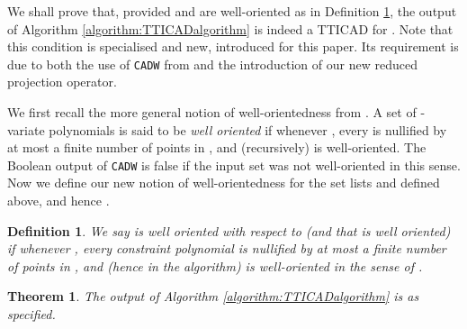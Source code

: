 \documentclass{article}
\newtheorem{definition}{Definition}
\newtheorem{theorem}{Theorem}
\begin{document}
We shall prove that, provided  and  are well-oriented as in Definition \ref{def:tticadwellorientedness}, the output of  Algorithm \ref{algorithm:TTICADalgorithm} is indeed a TTICAD for .
Note that this condition is specialised and new, introduced for this paper.  Its requirement is due to both the use of \texttt{CADW} from \cite{McCallum1998} and the introduction of our new reduced projection operator.

We first recall the more general notion of well-orientedness from \cite{McCallum1998}.  A set  of
-variate polynomials is said to be {\em well oriented} if whenever ,
every  is nullified by at most a finite number of points
in , and (recursively)  is well-oriented.  The Boolean output of \texttt{CADW} is false if the input set was not well-oriented in this sense. 
Now we define our new notion of well-orientedness for the set lists  and  defined above, and hence .
\begin{definition}\label{def:tticadwellorientedness}
We say  is {\em well oriented with respect to}  (and that  is {\em well oriented}) if whenever , every constraint polynomial  is nullified by at most a finite number of points in , and  
(hence  in the algorithm) is well-oriented in the sense of \cite{McCallum1998}.
\end{definition}
\begin{theorem}
The output of Algorithm \ref{algorithm:TTICADalgorithm} is as specified.  
\end{theorem}
\end{document}
